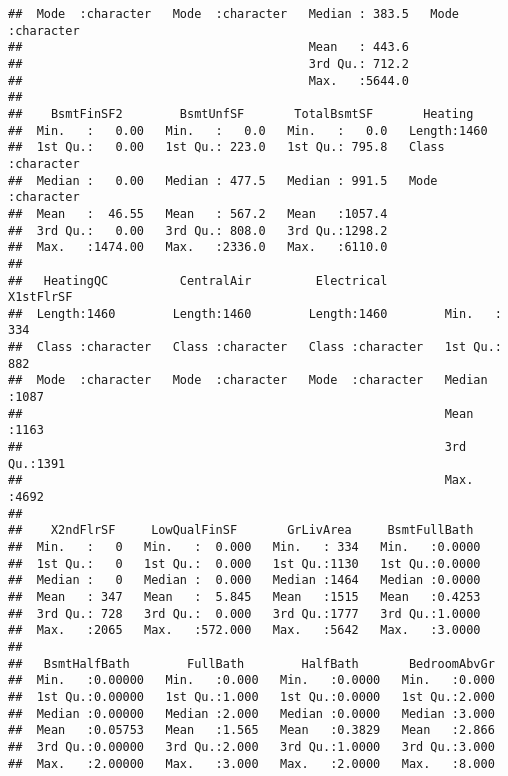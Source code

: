 \documentclass[]{article}
\begin{document}
\begin{verbatim}
##  Mode  :character   Mode  :character   Median : 383.5   Mode  :character  
##                                        Mean   : 443.6                     
##                                        3rd Qu.: 712.2                     
##                                        Max.   :5644.0                     
##                                                                           
##    BsmtFinSF2        BsmtUnfSF       TotalBsmtSF       Heating         
##  Min.   :   0.00   Min.   :   0.0   Min.   :   0.0   Length:1460       
##  1st Qu.:   0.00   1st Qu.: 223.0   1st Qu.: 795.8   Class :character  
##  Median :   0.00   Median : 477.5   Median : 991.5   Mode  :character  
##  Mean   :  46.55   Mean   : 567.2   Mean   :1057.4                     
##  3rd Qu.:   0.00   3rd Qu.: 808.0   3rd Qu.:1298.2                     
##  Max.   :1474.00   Max.   :2336.0   Max.   :6110.0                     
##                                                                        
##   HeatingQC          CentralAir         Electrical          X1stFlrSF   
##  Length:1460        Length:1460        Length:1460        Min.   : 334  
##  Class :character   Class :character   Class :character   1st Qu.: 882  
##  Mode  :character   Mode  :character   Mode  :character   Median :1087  
##                                                           Mean   :1163  
##                                                           3rd Qu.:1391  
##                                                           Max.   :4692  
##                                                                         
##    X2ndFlrSF     LowQualFinSF       GrLivArea     BsmtFullBath   
##  Min.   :   0   Min.   :  0.000   Min.   : 334   Min.   :0.0000  
##  1st Qu.:   0   1st Qu.:  0.000   1st Qu.:1130   1st Qu.:0.0000  
##  Median :   0   Median :  0.000   Median :1464   Median :0.0000  
##  Mean   : 347   Mean   :  5.845   Mean   :1515   Mean   :0.4253  
##  3rd Qu.: 728   3rd Qu.:  0.000   3rd Qu.:1777   3rd Qu.:1.0000  
##  Max.   :2065   Max.   :572.000   Max.   :5642   Max.   :3.0000  
##                                                                  
##   BsmtHalfBath        FullBath        HalfBath       BedroomAbvGr  
##  Min.   :0.00000   Min.   :0.000   Min.   :0.0000   Min.   :0.000  
##  1st Qu.:0.00000   1st Qu.:1.000   1st Qu.:0.0000   1st Qu.:2.000  
##  Median :0.00000   Median :2.000   Median :0.0000   Median :3.000  
##  Mean   :0.05753   Mean   :1.565   Mean   :0.3829   Mean   :2.866  
##  3rd Qu.:0.00000   3rd Qu.:2.000   3rd Qu.:1.0000   3rd Qu.:3.000  
##  Max.   :2.00000   Max.   :3.000   Max.   :2.0000   Max.   :8.000  

\end{verbatim}
\end{document}
